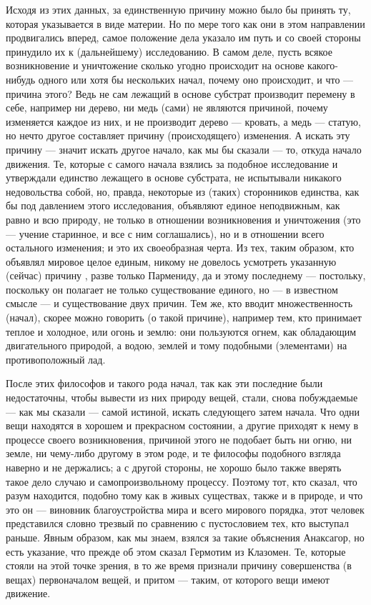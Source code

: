 \documentclass{article}
\begin{document}
Исходя из этих данных, за единственную причину можно было бы принять ту, которая указывается в виде материи. Но по мере того как они в этом направлении продвигались вперед, самое положение дела указало им путь и со своей стороны принудило их к (дальнейшему) исследованию. В самом деле, пусть всякое возникновение и уничтожение сколько угодно происходит на основе какого-нибудь одного или хотя бы нескольких начал, почему оно происходит, и что — причина этого? Ведь не сам лежащий в основе субстрат производит перемену в себе, например ни дерево, ни медь (сами) не являются причиной, почему изменяется каждое из них, и не производит дерево — кровать, а медь — статую, но нечто другое составляет причину (происходящего) изменения. А искать эту причину — значит искать другое начало, как мы бы сказали — то, откуда начало движения. Те, которые с самого начала взялись за подобное исследование и утверждали единство лежащего в основе субстрата, не испытывали никакого недовольства собой, но, правда, некоторые из (таких) сторонников единства, как бы под давлением этого исследования, объявляют единое неподвижным, как равно и всю природу, не только в отношении возникновения и уничтожения (это — учение старинное, и все с ним соглашались), но и в отношении всего остального изменения; и это их своеобразная черта. Из тех, таким образом, кто объявлял мировое целое единым, никому не довелось усмотреть указанную (сейчас) причину
\footnotemark[11]
, разве только Пармениду, да и этому последнему — постольку, поскольку он полагает не только существование единого, но — в известном смысле — и существование двух причин. Тем же, кто вводит множественность (начал), скорее можно говорить (о такой причине), например тем, кто принимает теплое и холодное, или огонь и землю: они пользуются огнем, как обладающим двигательного природой, а водою, землей и тому подобными (элементами) на противоположный лад.

После этих философов и такого рода начал, так как эти последние были недостаточны, чтобы вывести из них природу вещей, стали, снова побуждаемые — как мы сказали — самой истиной, искать следующего затем начала. Что одни вещи находятся в хорошем и прекрасном состоянии, а другие приходят к нему в процессе своего возникновения, причиной этого не подобает быть ни огню, ни земле, ни чему-либо другому в этом роде, и те философы подобного  взгляда наверно и не держались; а с другой стороны, не хорошо было также вверять такое дело случаю и самопроизвольному процессу. Поэтому тот, кто сказал, что разум находится, подобно тому как в живых существах, также и в природе, и что это он — виновник благоустройства мира и всего мирового порядка, этот человек представился словно трезвый по сравнению с пустословием тех, кто выступал раньше. Явным образом, как мы знаем, взялся за такие объяснения Анаксагор, но есть указание, что прежде об этом сказал Гермотим из Клазомен. Те, которые стояли на этой точке зрения, в то же время признали причину совершенства
\footnotemark[12]
(в вещах) первоначалом вещей, и притом — таким, от которого вещи имеют движение.
\end{document}
